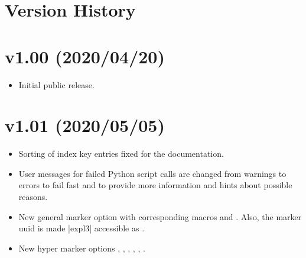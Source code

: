 \clearpage
\section{Version History}%

\section*{v1.00 (2020/04/20)}
\begin{itemize}
\item Initial public release.
\end{itemize}

\section*{v1.01 (2020/05/05)}
\begin{itemize}
\item Sorting of index key entries fixed for the documentation.
\item User messages for failed Python script calls are changed from warnings to
  errors to fail fast and to provide more information and hints about
  possible reasons.
\item New general marker option
   with corresponding macros
  and . Also, the marker uuid is
  made |expl3| accessible as .
\item New hyper marker options
  ,
  ,
  ,
  ,
  ,
  .
\end{itemize}
